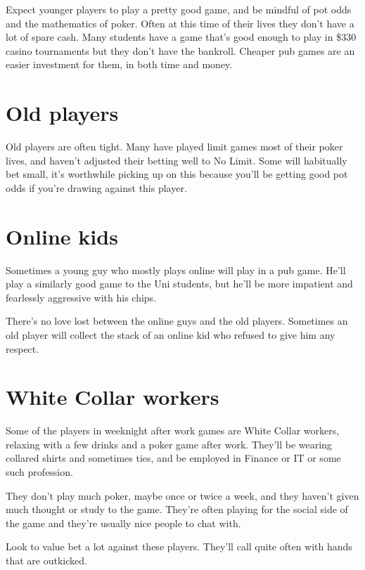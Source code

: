 Expect younger players to play a pretty good game, and be mindful of pot
odds and the mathematics of poker. Often at this time of their lives
they don't have a lot of spare cash. Many students have a game that's
good enough to play in \$330 casino tournaments but they don't have
the bankroll. Cheaper pub games are an easier investment for them,
in both time and money.

\section{Old players}

Old players are often tight. Many have played limit games most of their
poker lives, and haven't adjusted their betting well to No Limit. Some
will habitually bet small, it's worthwhile picking up on this because
you'll be getting good pot odds if you're drawing against this player.

\section{Online kids}

Sometimes a young guy who mostly plays online will play in a pub game.
He'll play a similarly good game to the Uni students, but he'll be
more impatient and fearlessly aggressive with his chips.

There's no love lost between the online guys and the old players. Sometimes
an old player will collect the stack of an online kid who refused to
give him any respect.

\section{White Collar workers}

Some of the players in weeknight after work games are White
Collar workers, relaxing with a few drinks and a poker game after work.
They'll be wearing collared shirts and sometimes ties, and be employed
in Finance or IT or some such profession.

They don't play much poker, maybe once or twice a week, and they haven't
given much thought or study to the game. They're often playing for the
social side of the game and they're usually nice people to chat with.

Look to value bet a lot against these players. They'll call quite often
with hands that are outkicked.


